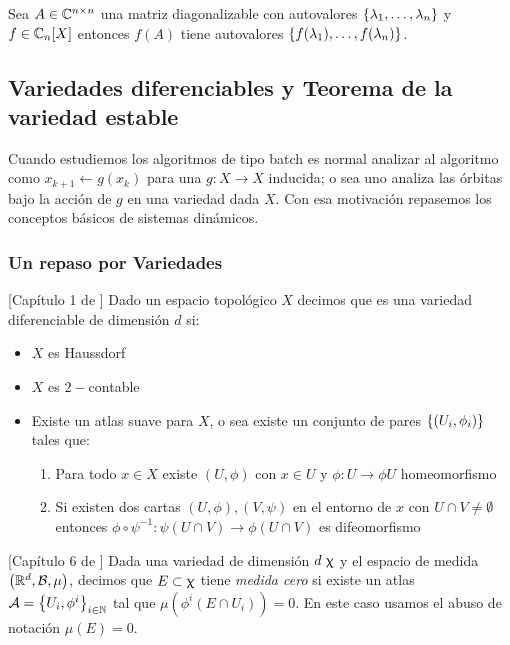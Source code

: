 \begin{corollary}
	Sea $A \in \mathbb{C}^{n \times n}$ una matriz diagonalizable con autovalores $\left\lbrace\lambda_1, \dots, \lambda_n\right\rbrace$ y $f \in \mathbb{C}_n[X]$ entonces $f(A)$ tiene autovalores $\left\lbrace f(\lambda_1), \dots, f(\lambda_n)\right\rbrace$.
\end{corollary}

\subsection{Variedades diferenciables y Teorema de la variedad estable}

Cuando estudiemos los algoritmos de tipo batch es normal analizar al algoritmo como $x_{k+1} \gets g(x_k)$ para una $g : X \rightarrow X$ inducida; o sea uno analiza las \'orbitas bajo la acci\'on de $g$ en una variedad dada $X$. Con esa motivaci\'on repasemos los conceptos b\'asicos de sistemas din\'amicos.

\subsubsection{Un repaso por Variedades}

\begin{definition}{[Cap\'itulo 1 de \cite{lee:00}]}
	Dado un espacio topol\'ogico $X$ decimos que es una variedad diferenciable de dimensi\'on $d$ si:
	
	\begin{itemize}
		\item $X$ es Haussdorf
		\item $X$ es $2-$contable
		\item Existe un atlas suave para $X$, o sea existe un conjunto de pares $\left\lbrace\left(U_i, \phi_i\right)\right\rbrace$ tales que:
		
		\begin{enumerate}
			\item Para todo $x \in X$ existe $(U,\phi)$ con $x \in U$ y $\phi: U \rightarrow \phi{U}$ homeomorfismo
			\item Si existen dos cartas $(U,\phi), (V,\psi)$ en el entorno de $x$ con $U \cap V \neq \emptyset$ entonces $\phi \circ \psi^{-1} : \psi(U\cap V )\rightarrow \phi(U\cap V)$ es difeomorfismo
		\end{enumerate}
	\end{itemize}
	
\end{definition}

\begin{definition}{[Cap\'itulo 6 de \cite{lee:00}]}
	Dada una variedad de dimensi\'on $d \ \upchi$ y el espacio de medida $\left({\mathbb{R}}^d, \mathcal{B}, \mu\right)$, decimos que $E \subset \upchi$ tiene \textit{medida cero} si existe un atlas $\mathcal{A} = \left\lbrace U_i, \phi^i\right\rbrace_{i \in {\mathbb{N}}}$ tal que $\mu \left(\phi^i \left(E \cap U_i \right) \right) = 0$. En este caso usamos el abuso de notaci\'on $\mu(E) = 0$.
\end{definition}

